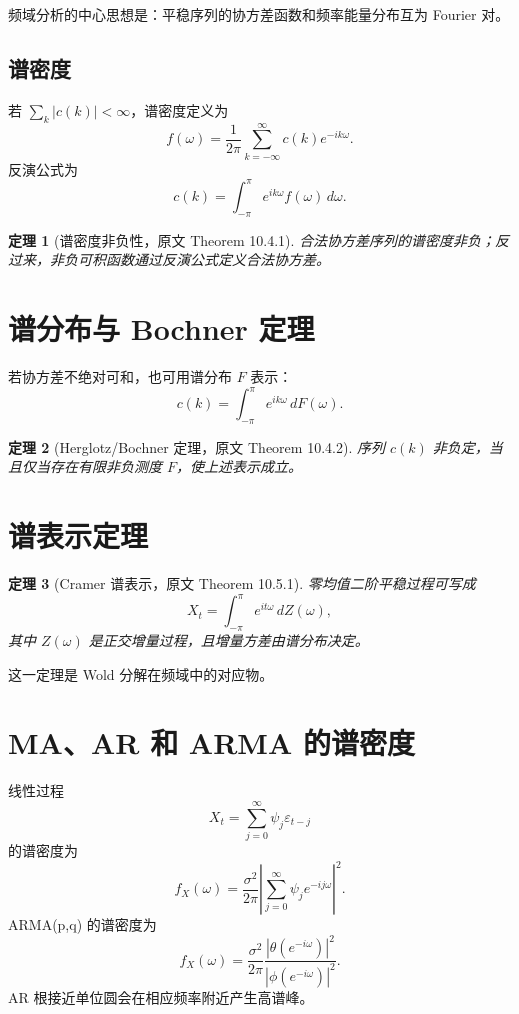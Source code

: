 \documentclass[11pt,a4paper]{ctexart}
\newtheorem{theorem}{定理}[section]
\begin{document}
频域分析的中心思想是：平稳序列的协方差函数和频率能量分布互为 Fourier 对。

\subsection{谱密度}

若 \(\sum_k|c(k)|<\infty\)，谱密度定义为
\[
  f(\omega)=\frac1{2\pi}\sum_{k=-\infty}^{\infty}c(k)e^{-ik\omega}.
\]
反演公式为
\[
  c(k)=\int_{-\pi}^{\pi}e^{ik\omega}f(\omega)\,d\omega.
\]

\begin{theorem}[谱密度非负性，原文 Theorem 10.4.1]
合法协方差序列的谱密度非负；反过来，非负可积函数通过反演公式定义合法协方差。
\end{theorem}

\section{谱分布与 Bochner 定理}

若协方差不绝对可和，也可用谱分布 \(F\) 表示：
\[
  c(k)=\int_{-\pi}^{\pi}e^{ik\omega}\,dF(\omega).
\]
\begin{theorem}[Herglotz/Bochner 定理，原文 Theorem 10.4.2]
序列 \(c(k)\) 非负定，当且仅当存在有限非负测度 \(F\)，使上述表示成立。
\end{theorem}

\section{谱表示定理}

\begin{theorem}[Cramer 谱表示，原文 Theorem 10.5.1]
零均值二阶平稳过程可写成
\[
  X_t=\int_{-\pi}^{\pi}e^{it\omega}\,dZ(\omega),
\]
其中 \(Z(\omega)\) 是正交增量过程，且增量方差由谱分布决定。
\end{theorem}

这一定理是 Wold 分解在频域中的对应物。

\section{MA、AR 和 ARMA 的谱密度}

线性过程
\[
  X_t=\sum_{j=0}^{\infty}\psi_j\varepsilon_{t-j}
\]
的谱密度为
\[
  f_X(\omega)=\frac{\sigma^2}{2\pi}
  \left|\sum_{j=0}^{\infty}\psi_je^{-ij\omega}\right|^2.
\]
ARMA(p,q) 的谱密度为
\[
  f_X(\omega)=\frac{\sigma^2}{2\pi}
  \frac{|\theta(e^{-i\omega})|^2}{|\phi(e^{-i\omega})|^2}.
\]
AR 根接近单位圆会在相应频率附近产生高谱峰。
\end{document}
